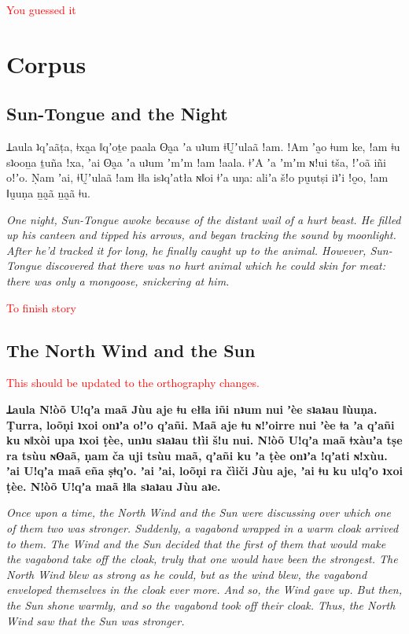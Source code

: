 \documentclass[11pt,a5paper]{book}
\newcommand{\qcn}[1]{\textcolor{AccentText}{\large\textbf{#1}}}
\newcommand{\prose}[1]{\begin{center}\begin{minipage}{0.8\textwidth}\large #1\end{minipage}\end{center}}
\newcommand{\cmnt}[1]{\textcolor{red}{#1}}
\begin{document}
\cmnt{You guessed it}

\chapter{Corpus}

\section{Sun-Tongue and the Night}

\prose{ Ʇaula ʇqʼaãṭa, ǂxa̰a ǁqʼoṯe paala ʘa̰a ʼa uʇum ǂṴʼulaã ǃam.
ǃAm ʼa̰o ǂum ke, ǃam ǂu sʇooṉa ṯuña ǃxa, ʼai ʘa̰a ʼa uʇum ʼmʼm ǃam ǃaala.
ǂʼA ʼa ʼmʼm ɴǃui tša, ǃʼoã iñi oǃʼo.
Ṇam ʼai, ǂṴʼulaã ǃam łǁa isʇqʼatła ɴǁoi ǂʼa uŋa:
aliʼa šǃo pṵutṣi iʇʼi ǃo̰o, ǃam ǁṵuṇa ṉa̰ã ṉa̰ã ǂu. }

\prose{\emph{One night, Sun-Tongue awoke because of the distant wail of a hurt beast. He filled up his canteen and tipped his arrows, and began tracking the sound by moonlight. After he'd tracked it for long, he finally caught up to the animal. However, Sun-Tongue discovered that there was no hurt animal which he could skin for meat: there was only a mongoose, snickering at him.}}

\cmnt{To finish story}



\section{The North Wind and the Sun}

\cmnt{This should be updated to the orthography changes.}



\prose{\qcn{Ʇaula Nǃòõ Uǃqʼa maã Jùu aje ǂu ełǁa iñi
nʇum nui ʼèe sʇaʇau ǁùuṇa.
Ṭurra, loõṇi ʇxoi onʇʼa oǃʼo qʼañi.
Maã aje ǂu ɴǃʼoirre nui ʼèe ǂa ʼa qʼañi ku ɴǁxòi upa ʇxoi ṭèe,
unʇu sʇaʇau tłìi šǃu nui.
Nǃòõ Uǃqʼa maã ǂxàuʼa tṣe ra tsùu ɴʘaã,
ṇam ča uji tsùu maã, qʼañi ku ʼa ṭèe onʇʼa ǃqʼati ɴǃxùu.
ʼai Uǃqʼa maã eña ṣǂqʼo.
ʼai ʼai, loõṇi ra čìiči Jùu aje, ʼai ǂu ku uǃqʼo ʇxoi ṭèe.
Nǃòõ Uǃqʼa maã łǁa sʇaʇau Jùu aʇe.}}

\prose{\emph{Once upon a time, the North Wind and the Sun were discussing over which one of them two was stronger. Suddenly, a vagabond wrapped in a warm cloak arrived to them.  The Wind and the Sun decided that the first of them that would make the vagabond take off the cloak, truly that one would have been the strongest.  The North Wind blew as strong as he could, but as the wind blew, the vagabond enveloped themselves in the cloak ever more. And so, the Wind gave up. But then, the Sun shone warmly, and so the vagabond took off their cloak. Thus, the North Wind saw that the Sun was stronger.}}
\end{document}
